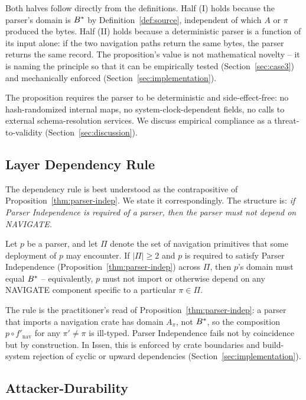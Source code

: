 Both halves follow directly from the definitions. Half (I) holds because the
parser's domain is $B^{*}$ by Definition~\ref{def:source}, independent of
which $A$ or $\pi$ produced the bytes. Half (II) holds because a
deterministic parser is a function of its input alone: if the two navigation
paths return the same bytes, the parser returns the same record. The
proposition's value is not mathematical novelty -- it is naming the principle
so that it can be empirically tested (Section~\ref{sec:case3}) and
mechanically enforced (Section~\ref{sec:implementation}).

The proposition requires the parser to be deterministic and side-effect-free:
no hash-randomized internal maps, no system-clock-dependent fields, no calls
to external schema-resolution services. We discuss empirical compliance as a
threat-to-validity (Section~\ref{sec:discussion}).

\subsection{Layer Dependency Rule}

The dependency rule is best understood as the contrapositive of
Proposition~\ref{thm:parser-indep}. We state it correspondingly. The
structure is: \emph{if Parser Independence is required of a parser, then
the parser must not depend on NAVIGATE.}

\begin{proposition}
\label{thm:layer-rule}
Let $p$ be a parser, and let $\Pi$ denote the set of navigation primitives
that some deployment of $p$ may encounter. If $|\Pi| \geq 2$ and $p$ is
required to satisfy Parser Independence (Proposition~\ref{thm:parser-indep})
across $\Pi$, then $p$'s domain must equal $B^{*}$ -- equivalently, $p$
must not import or otherwise depend on any NAVIGATE component specific to a
particular $\pi \in \Pi$.
\end{proposition}

The rule is the practitioner's read of Proposition~\ref{thm:parser-indep}:
a parser that imports a navigation crate has domain $A_\pi$, not $B^{*}$,
so the composition $p \circ f'_{\mathrm{nav}}$ for any $\pi' \neq \pi$ is
ill-typed. Parser Independence fails not by coincidence but by construction.
In Issen, this is enforced by crate boundaries and build-system rejection
of cyclic or upward dependencies (Section~\ref{sec:implementation}).

\subsection{Attacker-Durability}

